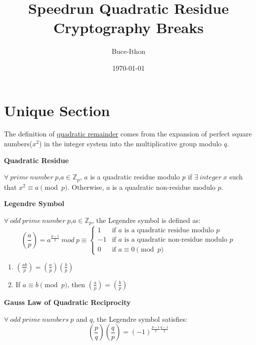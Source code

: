 \documentclass{Math_Note}
\title{Speedrun Quadratic Residue \\ \small{Cryptography Breaks}}
\author{Buce-Ithon}
\date{\today}
\begin{document}
\maketitle

\newpage
\tableofcontents
\newpage

\section{Unique Section}

The definition of \underline{quadratic remainder} comes from the expansion of perfect square numbers($x^2$) in the integer system into the multiplicative group modulo $q$.

\begin{df}
    \textbf{Quadratic Residue} \par
    $\forall\ prime\ number\ p$,$a \in \mathbb{Z}_{p}$, $a$ is a quadratic residue modulo $p$ if $\exists\ integer\ x$ such that $x^2 \equiv a \pmod{p}$.
    Otherwise, $a$ is a quadratic non-residue modulo $p$.
\end{df}

\begin{df}
    \textbf{Legendre Symbol} \par
    $\forall\ odd\ prime\ number\ p$,$a \in \mathbb{Z}_{p}$, the Legendre symbol is defined as:
    \[
        \left(\frac{a}{p}\right) = 
        a^{\frac{p-1}{2}}\ mod\ p\equiv
        \begin{cases}
            1 & \text{if $a$ is a quadratic residue modulo $p$} \\
            -1 & \text{if $a$ is a quadratic non-residue modulo $p$} \\
            0 & \text{if $a \equiv 0 \pmod{p}$}
        \end{cases}
    \]
\end{df}

\begin{prp}
    \begin{enumerate}
        \item $\left(\frac{ab}{p}\right)=\left(\frac{a}{p}\right)\left(\frac{b}{p}\right)$
        \item If $a \equiv b \pmod{p}$, then $\left(\frac{a}{p}\right)=\left(\frac{b}{p}\right)$
    \end{enumerate}
\end{prp}

\begin{thm}
    \textbf{Gauss Law of Quadratic Reciprocity} \par
    $\forall\ odd\ prime\ numbers\ p$ and $q$, the Legendre symbol satisfies:
    \[
        \left(\frac{p}{q}\right)\left(\frac{q}{p}\right)=(-1)^{\frac{p-1}{2}\frac{q-1}{2}}
    \]
\end{thm}
\end{document}
